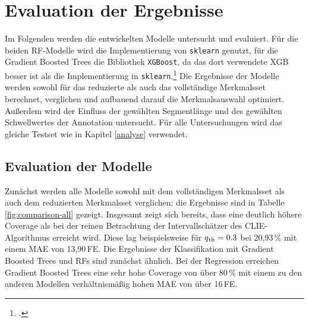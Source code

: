 \chapter{Evaluation der Ergebnisse}\label{evaluation}

Im Folgenden werden die entwickelten Modelle untersucht und evaluiert. Für die beiden \acl{RF}-Modelle wird die Implementierung von \texttt{sklearn} genutzt, für die Gradient Boosted Trees die Bibliothek \texttt{XGBoost}, da das dort verwendete \acl{XGB} besser ist als die Implementierung in \texttt{sklearn}.\footcite[Kapitel 10]{Harrison2019} Die Ergebnisse der Modelle werden sowohl für das reduzierte als auch das vollständige Merkmalsset berechnet, verglichen und aufbauend darauf die Merkmalsauswahl optimiert. Außerdem wird der Einfluss der gewählten Segmentlänge und des gewählten Schwellwertes der Annotation untersucht. Für alle Untersuchungen wird das gleiche Testset wie in Kapitel \ref{analyse} verwendet.

\section{Evaluation der Modelle}

Zunächst werden alle Modelle sowohl mit dem vollständigen Merkmalsset als auch dem reduzierten Merkmalsset verglichen; die Ergebnisse sind in Tabelle \ref{fig:comparison-all} gezeigt. Insgesamt zeigt sich bereits, dass eine deutlich höhere Coverage als bei der reinen Betrachtung der Intervallschätzer des CLIE-Algorithmus erreicht wird. Diese lag beispielsweise für $q\textsubscript{th} = 0.3$ bei 20,93\,\% mit einem \ac{MAE} von 13,90\,\si{FE}. Die Ergebnisse der Klassifikation mit Gradient Boosted Trees und \acl{RF}s sind zunächst ähnlich. Bei der Regression erreichen Gradient Boosted Trees eine sehr hohe Coverage von über 80\,\% mit einem zu den anderen Modellen verhältnismäßig hohen \ac{MAE} von über 16\,\si{FE}.


